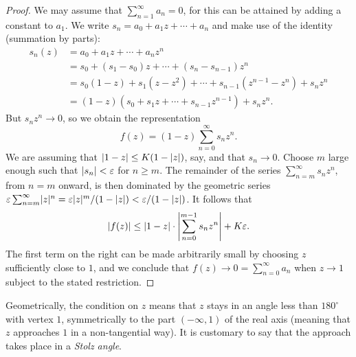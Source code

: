 \begin{proof}
	We may assume that $\sum_{n=1}^{\infty}a_n=0$, for this can be attained by adding a constant to $a_1$. We write $s_n=a_0+a_1z+\cdots+a_n$ and make use of the identity (summation by parts):
	\begin{align*}
		s_n(z) &=a_0+a_1z+\cdots+a_nz^n \\
		&=s_0+(s_1-s_0)z+\cdots+(s_n-s_{n-1})z^n \\
		&=s_0(1-z)+s_1(z-z^2)+\cdots+s_{n-1}(z^{n-1}-z^n)+s_nz^n \\
		&=(1-z)(s_0+s_1z+\cdots+s_{n-1}z^{n-1})+s_nz^n.
	\end{align*}
	But $s_nz^n \rightarrow 0$, so we obtain the representation $$f(z)=(1-z)\sum_{n=0}^{\infty}s_nz^n.$$ We are assuming that $\lvert 1-z \rvert \le K(1-\lvert z \rvert)$, say, and that $s_n \rightarrow 0$. Choose $m$ large enough such that $\lvert s_n \rvert<\varepsilon$ for $n \ge m$. The remainder of the series $\sum_{n=m}^{\infty}s_nz^n$, from $n=m$ onward, is then dominated by the geometric series $\varepsilon\sum_{n=m}^{\infty}\lvert z \rvert^n=\varepsilon\lvert z \rvert^m/(1-\lvert z \rvert)<\varepsilon/(1-\lvert z \rvert)$. It follows that $$\lvert f(z) \rvert \le \lvert 1-z \rvert \cdot \left\lvert \sum_{n=0}^{m-1}s_nz^n\right \rvert+K\varepsilon.$$ The first term on the right can be made arbitrarily small by choosing $z$ sufficiently close to $1$, and we conclude that $f(z) \rightarrow 0=\sum_{n=0}^{\infty}a_n$ when $z \rightarrow 1$ subject to the stated restriction.
\end{proof}

\begin{remark}
	Geometrically, the condition on $z$ means that $z$ stays in an angle less than $180^{\circ}$ with vertex $1$, symmetrically to the part $(-\infty,1)$ of the real axis (meaning that $z$ approaches $1$ in a non-tangential way). It is customary to say that the approach takes place in a \emph{Stolz angle}.
\end{remark}



   
